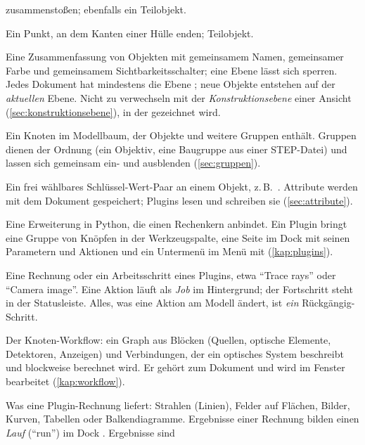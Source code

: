 \begin{description}
    zusammenstoßen; ebenfalls ein Teilobjekt.
  \item[Eckpunkt (Vertex)] Ein Punkt, an dem Kanten einer Hülle enden;
    Teilobjekt.
  \item[Ebene (Layer)] Eine Zusammenfassung von Objekten mit
    gemeinsamem Namen, gemeinsamer Farbe und gemeinsamem Sichtbarkeitsschalter; eine Ebene
    lässt sich sperren. Jedes Dokument hat mindestens die Ebene ; neue Objekte
    entstehen auf der \emph{aktuellen} Ebene. Nicht zu verwechseln mit der
    \emph{Konstruktionsebene} einer Ansicht (\autoref{sec:konstruktionsebene}), in der
    gezeichnet wird.
  \item[Gruppe] Ein Knoten im Modellbaum, der Objekte und weitere Gruppen
    enthält. Gruppen dienen der Ordnung (ein Objektiv, eine Baugruppe aus einer STEP-Datei)
    und lassen sich gemeinsam ein- und ausblenden (\autoref{sec:gruppen}).
  \item[Attribut] Ein frei wählbares Schlüssel-Wert-Paar an einem Objekt,
    z.\,B.\ . Attribute werden mit dem Dokument gespeichert; Plugins
    lesen und schreiben sie (\autoref{sec:attribute}).
  \item[Plugin] Eine Erweiterung in Python, die einen Rechenkern anbindet. Ein
    Plugin bringt eine Gruppe von Knöpfen in der Werkzeugspalte, eine Seite im Dock
     mit seinen Parametern und Aktionen und ein Untermenü im Menü 
    mit (\autoref{kap:plugins}).
  \item[Aktion] Eine Rechnung oder ein Arbeitsschritt eines Plugins, etwa
    \enquote{Trace rays} oder \enquote{Camera image}. Eine Aktion läuft als \emph{Job} im
    Hintergrund; der Fortschritt steht in der Statusleiste. Alles, was eine Aktion am Modell
    ändert, ist \emph{ein} Rückgängig-Schritt.
  \item[Workflow] Der Knoten-Workflow: ein Graph aus Blöcken (Quellen,
    optische Elemente, Detektoren, Anzeigen) und Verbindungen, der ein optisches System
    beschreibt und blockweise berechnet wird. Er gehört zum Dokument und wird im Fenster
     bearbeitet (\autoref{kap:workflow}).
  \item[Ergebnis] Was eine Plugin-Rechnung liefert: Strahlen (Linien), Felder
    auf Flächen, Bilder, Kurven, Tabellen oder Balkendiagramme. Ergebnisse einer Rechnung
    bilden einen \emph{Lauf} (\enquote{run}) im Dock . Ergebnisse sind

\end{description}
